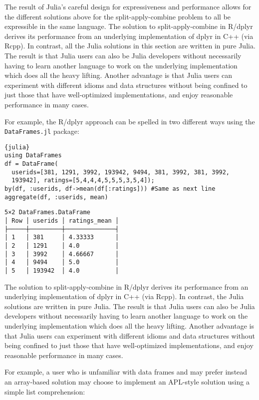\documentclass[11pt]{asaproc}
\begin{document}
The result of Julia's careful design for expressiveness and performance allows
for the different solutions above for the split-apply-combine problem to all be
expressible in the same language.
The solution to split-apply-combine in R/dplyr derives its performance from an
underlying implementation of dplyr in C++ (via Rcpp). In contrast, all the
Julia solutions in this section are written in pure Julia. The result is that
Julia users can also be Julia developers without necessarily having to learn
another language to work on the underlying implementation which does all the
heavy lifting. Another advantage is that Julia users can experiment with
different idioms and data structures without being confined to just those that
have well-optimized implementations, and enjoy reasonable performance in many
cases.

For example, the R/dplyr approach can be spelled in two different ways using
the \lstinline|DataFrames.jl| package:

\begin{lstlisting}{julia}
using DataFrames
df = DataFrame(
  userids=[381, 1291, 3992, 193942, 9494, 381, 3992, 381, 3992,
  193942], ratings=[5,4,4,4,5,5,5,3,5,4]);
by(df, :userids, df->mean(df[:ratings])) #Same as next line
aggregate(df, :userids, mean)
\end{lstlisting}
\begin{verbatim}
5×2 DataFrames.DataFrame
│ Row │ userids │ ratings_mean │
├─────┼─────────┼──────────────┤
│ 1   │ 381     │ 4.33333      │
│ 2   │ 1291    │ 4.0          │
│ 3   │ 3992    │ 4.66667      │
│ 4   │ 9494    │ 5.0          │
│ 5   │ 193942  │ 4.0          │
\end{verbatim}

The solution to split-apply-combine in R/dplyr derives its performance from an
underlying implementation of dplyr in C++ (via Rcpp). In contrast, the Julia
solutions are written in pure Julia. The result is that Julia users can also be
Julia developers without necessarily having to learn another language to work
on the underlying implementation which does all the heavy lifting. Another
advantage is that Julia users can experiment with different idioms and data
structures without being confined to just those that have well-optimized
implementations, and enjoy reasonable performance in many cases.

For example, a user who is unfamiliar with data frames and may prefer instead
an array-based solution may choose to implement an APL-style solution using a
simple list comprehension:
\end{document}
